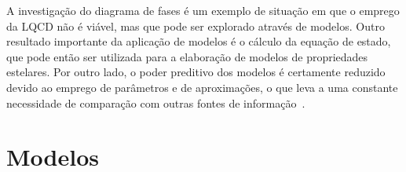 A investigação do diagrama de fases é um exemplo de situação em que o emprego da LQCD não é viável, mas que pode ser explorado através de modelos. Outro resultado importante da aplicação de modelos é o cálculo da equação de estado, que pode então ser utilizada para a elaboração de modelos de propriedades estelares. Por outro lado, o poder preditivo dos modelos é certamente reduzido devido ao emprego de parâmetros e de aproximações, o que leva a uma constante necessidade de comparação com outras fontes de informação~\parencite{Buballa}.


\section{Modelos}




